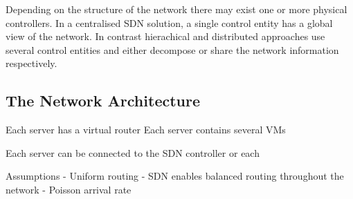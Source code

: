 Depending on the structure of the network there may exist one or more physical controllers. In a centralised SDN solution, a single control entity has a global view of the network. In contrast hierachical and distributed approaches use several control entities and either decompose or share the network information respectively.

\subsection{The Network Architecture}
Each server has a virtual router
Each server contains several VMs

Each server can be connected to the SDN controller or each 

Assumptions
- Uniform routing
- SDN enables balanced routing throughout the network
- Poisson arrival rate